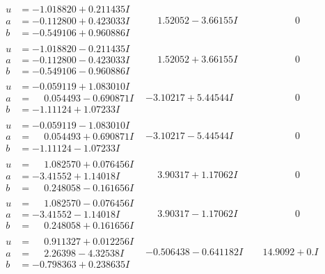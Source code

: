 \documentclass[1p]{elsarticle_modified}
\theoremstyle{definition}
\begin{document}
$$\begin{array}{c|c|c}
\begin{aligned}
u &= -1.018820 + 0.211435 I \\
a &= -0.112800 + 0.423033 I \\
b &= -0.549106 + 0.960886 I\end{aligned}
 & \phantom{-}1.52052 - 3.66155 I & \phantom{-0.000000 } 0 \\ \hline\begin{aligned}
u &= -1.018820 - 0.211435 I \\
a &= -0.112800 - 0.423033 I \\
b &= -0.549106 - 0.960886 I\end{aligned}
 & \phantom{-}1.52052 + 3.66155 I & \phantom{-0.000000 } 0 \\ \hline\begin{aligned}
u &= -0.059119 + 1.083010 I \\
a &= \phantom{-}0.054493 - 0.690871 I \\
b &= -1.11124 + 1.07233 I\end{aligned}
 & -3.10217 + 5.44544 I & \phantom{-0.000000 } 0 \\ \hline\begin{aligned}
u &= -0.059119 - 1.083010 I \\
a &= \phantom{-}0.054493 + 0.690871 I \\
b &= -1.11124 - 1.07233 I\end{aligned}
 & -3.10217 - 5.44544 I & \phantom{-0.000000 } 0 \\ \hline\begin{aligned}
u &= \phantom{-}1.082570 + 0.076456 I \\
a &= -3.41552 + 1.14018 I \\
b &= \phantom{-}0.248058 - 0.161656 I\end{aligned}
 & \phantom{-}3.90317 + 1.17062 I & \phantom{-0.000000 } 0 \\ \hline\begin{aligned}
u &= \phantom{-}1.082570 - 0.076456 I \\
a &= -3.41552 - 1.14018 I \\
b &= \phantom{-}0.248058 + 0.161656 I\end{aligned}
 & \phantom{-}3.90317 - 1.17062 I & \phantom{-0.000000 } 0 \\ \hline\begin{aligned}
u &= \phantom{-}0.911327 + 0.012256 I \\
a &= \phantom{-}2.26398 - 4.32538 I \\
b &= -0.798363 + 0.238635 I\end{aligned}
 & -0.506438 - 0.641182 I & \phantom{-}14.9092 + 0. I\phantom{ +0.000000I} \\ \hline\begin{aligned}

\end{aligned}
\end{array}$$
\end{document}
